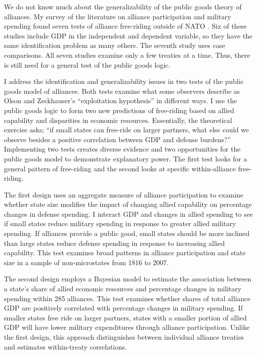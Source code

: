 \documentclass[12pt]{article}
\begin{document}
We do not know  much about the generalizability of the public goods theory of alliances. 
My survey of the literature on alliance participation and military spending found seven tests of alliance free-riding outside of NATO \citep{Russett1970, Starr1974, Reisinger1983, Thies1987, ConybeareSandler1990, OnealWhatley1996, Siroky2012}. 
Six of these studies include GDP in the independent and dependent variable, so they have the same identification problem as many others.
The seventh study uses case comparisons.
All seven studies examine only a few treaties at a time. 
Thus, there is still need for a general test of the public goods logic. 


I address the identification and generalizability issues in two tests of the public goods model of alliances.  
Both tests examine what some observers describe as Olson and Zeckhauser's ``exploitation hypothesis'' in different ways.   
I use the public goods logic to form two new predictions of free-riding based on allied capability and disparities in economic resources.
Essentially, the theoretical exercise asks; ``if small states can free-ride on larger partners, what else could we observe besides a positive correlation between GDP and defense burdens?'' 
Implementing two tests creates diverse evidence and two opportunities for the public goods model to demonstrate explanatory power. 
The first test looks for a general pattern of free-riding and the second looks at specific within-alliance free-riding. 


The first design uses an aggregate measure of alliance participation to examine whether state size modifies the impact of changing allied capability on percentage changes in defense spending.
I interact GDP and changes in allied spending to see if small states reduce military spending in response to greater allied military spending. 
If alliances provide a public good, small states should be more inclined than large states reduce defense spending in response to increasing allied capability. 
This test examines broad patterns in alliance participation and state size in a sample of non-microstates from 1816 to 2007. 


The second design employs a Bayesian model to estimate the association between a state's share of allied economic resources and percentage changes in military spending within 285 alliances. 
This test examines whether shares of total alliance GDP are positively correlated with percentage changes in military spending. 
If smaller states free ride on larger partners, states with a smaller portion of allied GDP will have lower military expenditures through alliance participation.
Unlike the first design, this approach distinguishes between individual alliance treaties and estimates within-treaty correlations. 
\end{document}

